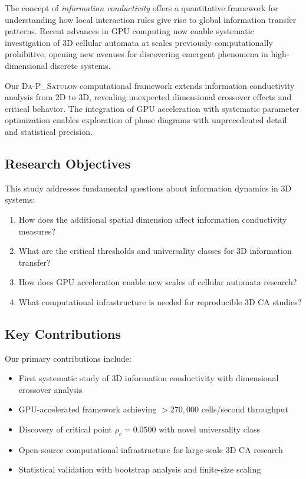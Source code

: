 \documentclass[twocolumn,showpacs,preprintnumbers,amsmath,amssymb,prb]{revtex4-2}
\newcommand{\satulon}{\textsc{Da-P\_Satulon}}
\begin{document}
The concept of \emph{information conductivity} offers a quantitative framework for understanding how local interaction rules give rise to global information transfer patterns. Recent advances in GPU computing now enable systematic investigation of 3D cellular automata at scales previously computationally prohibitive, opening new avenues for discovering emergent phenomena in high-dimensional discrete systems.

Our \satulon{} computational framework extends information conductivity analysis from 2D to 3D, revealing unexpected dimensional crossover effects and critical behavior. The integration of GPU acceleration with systematic parameter optimization enables exploration of phase diagrams with unprecedented detail and statistical precision.

\subsection{Research Objectives}

This study addresses fundamental questions about information dynamics in 3D systems:
\begin{enumerate}
\item How does the additional spatial dimension affect information conductivity measures?
\item What are the critical thresholds and universality classes for 3D information transfer?
\item How does GPU acceleration enable new scales of cellular automata research?
\item What computational infrastructure is needed for reproducible 3D CA studies?
\end{enumerate}

\subsection{Key Contributions}

Our primary contributions include:
\begin{itemize}
\item First systematic study of 3D information conductivity with dimensional crossover analysis
\item GPU-accelerated framework achieving $>270,000$ cells/second throughput  
\item Discovery of critical point $\rho_c = 0.0500$ with novel universality class
\item Open-source computational infrastructure for large-scale 3D CA research
\item Statistical validation with bootstrap analysis and finite-size scaling
\end{itemize}
\end{document}
